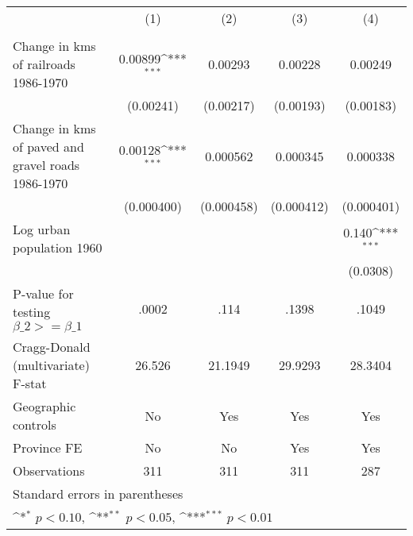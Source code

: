 {
\def\sym#1{\ifmmode^{#1}\else\(^{#1}\)\fi}
\begin{tabular}{l*{4}{c}}
\hline\hline
                &\multicolumn{1}{c}{(1)}&\multicolumn{1}{c}{(2)}&\multicolumn{1}{c}{(3)}&\multicolumn{1}{c}{(4)}\\
                &\multicolumn{1}{c}{}&\multicolumn{1}{c}{}&\multicolumn{1}{c}{}&\multicolumn{1}{c}{}\\
\hline
Change in kms of railroads 1986-1970&  0.00899\sym{***}&  0.00293         &  0.00228         &  0.00249         \\
                &(0.00241)         &(0.00217)         &(0.00193)         &(0.00183)         \\
[1em]
Change in kms of paved and gravel roads 1986-1970&  0.00128\sym{***}& 0.000562         & 0.000345         & 0.000338         \\
                &(0.000400)         &(0.000458)         &(0.000412)         &(0.000401)         \\
[1em]
Log urban population 1960&                  &                  &                  &    0.140\sym{***}\\
                &                  &                  &                  & (0.0308)         \\
\hline
P-value for testing $\beta\_{2} >= \beta\_{1}$&    .0002         &     .114         &    .1398         &    .1049         \\
Cragg-Donald (multivariate) F-stat&   26.526         &  21.1949         &  29.9293         &  28.3404         \\
Geographic controls&       No         &      Yes         &      Yes         &      Yes         \\
Province FE     &       No         &       No         &      Yes         &      Yes         \\
Observations    &      311         &      311         &      311         &      287         \\
\hline\hline
\multicolumn{5}{l}{\footnotesize Standard errors in parentheses}\\
\multicolumn{5}{l}{\footnotesize \sym{*} \(p<0.10\), \sym{**} \(p<0.05\), \sym{***} \(p<0.01\)}\\
\end{tabular}
}
